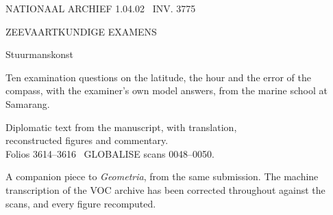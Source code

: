 \documentclass[11pt,twoside,openany]{book}
\begin{document}
\frontmatter
\thispagestyle{empty}
\vspace*{0.12\textheight}
{\color{msred}\scriptsize\MakeUppercase{Nationaal Archief 1.04.02 \textperiodcentered\ inv. 3775}}\par
{}\par
\vspace{0.20\textheight}
{\color{msmut}\small\MakeUppercase{Zeevaartkundige Examens}}\par\vspace{20pt}
{\color{msred}\fontsize{52}{52}\selectfont Stuurmanskonst}\par\vspace{20pt}
{\large Ten examination questions on the latitude, the hour and the error of the compass, with the examiner's own model answers, from the marine school at Samarang.}\par
{}\par\vspace{16pt}
{\color{msmut}\small Diplomatic text from the manuscript, with translation,\\reconstructed figures and commentary.\\Folios 3614--3616 \textperiodcentered\ GLOBALISE scans 0048--0050.}\par
\vfill
{\color{msfaint}\footnotesize A companion piece to \textit{Geometria}, from the same submission. The machine transcription of the VOC archive has been corrected throughout against the scans, and every figure recomputed.}\par
\clearpage
\end{document}
